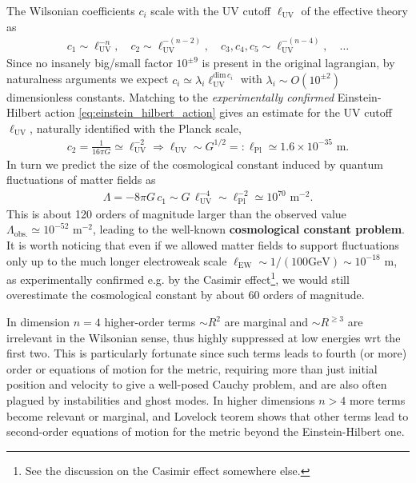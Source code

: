 \begin{mytheorem}
The Wilsonian coefficients $c_i$ scale with the UV cutoff $\ell_{\mathrm{UV}}$ of the effective theory as
\begin{align}
    c_1  \sim \ell_{\mathrm{UV}}^{-n}, \quad c_2 \sim \ell_{\mathrm{UV}}^{-(n-2)}, \quad c_3, c_4, c_5 \sim \ell_{\mathrm{UV}}^{-(n-4)}, \quad \ldots
\end{align}
Since no insanely big/small factor $10^{\pm9}$ is present in the original lagrangian, by naturalness arguments we expect $c_i\simeq \lambda_i \ell_{\mathrm{UV}}^{\mathrm{dim}\, c_i}$ with $\lambda_i\sim O(10^{\pm2})$ dimensionless constants.
%
Matching to the \emph{experimentally confirmed} Einstein-Hilbert action \eqref{eq:einstein_hilbert_action} gives an estimate for the UV cutoff $\ell_{\mathrm{UV}}$, naturally identified with the Planck scale,
\begin{align}
    c_2 = \frac{1}{16\pi G} \simeq \ell_{\mathrm{UV}}^{-2} \Rightarrow \ell_{\mathrm{UV}} \sim G^{1/2} =:  \ell_{\mathrm{Pl}} \simeq 1.6 \times 10^{-35} \text{ m}.
\end{align}
In turn we predict the size of the cosmological constant induced by quantum fluctuations of matter fields as
\begin{align}
    \Lambda = -8\pi G \, c_1 \sim G \, \ell_{\mathrm{UV}}^{-4} \sim \ell_{\mathrm{Pl}}^{-2} \simeq 10^{70} \text{ m}^{-2}.
\end{align}
This is about 120 orders of magnitude larger than the observed value $\Lambda_{\mathrm{obs.}}\simeq 10^{-52} \text{ m}^{-2}$, leading to the well-known \textbf{cosmological constant problem}.
%
It is worth noticing that even if we allowed matter fields to support fluctuations only up to the much longer electroweak scale $\ell_{\mathrm{EW}}\sim 1/(100\mathrm{GeV}) \sim 10^{-18} \text{ m}$, as experimentally confirmed e.g. by the Casimir effect\footnote{See the discussion on the Casimir effect somewhere else.}, we would still overestimate the cosmological constant by about 60 orders of magnitude.

In dimension $n=4$ higher-order terms $\sim R^2$ are marginal and $\sim R^{\geq3}$ are irrelevant in the Wilsonian sense, thus highly suppressed at low energies wrt the first two.
This is particularly fortunate since such terms leads to fourth (or more) order or equations of motion for the metric, requiring more than just initial position and velocity to give a well-posed Cauchy problem, and are also often plagued by instabilities and ghost modes.
In higher dimensions $n>4$ more terms become relevant or marginal, and Lovelock teorem shows that other terms lead to second-order equations of motion for the metric beyond the Einstein-Hilbert one.


\end{mytheorem}
